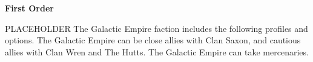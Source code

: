 \documentclass{article}
\begin{document}
{\Huge \textbf{First Order}}
\vspace{0.6cm}

\begin{minipage}{19cm}
    PLACEHOLDER
    The Galactic Empire faction includes the following profiles and options.
    The Galactic Empire can be close allies with Clan Saxon, and cautious allies
    with Clan Wren and The Hutts. The Galactic Empire can take mercenaries.
\end{minipage}

\vspace{0.3cm}
{\scriptsize

\setlength\extrarowheight{1.5pt}


}
\vspace{0.6cm}
\end{document}
